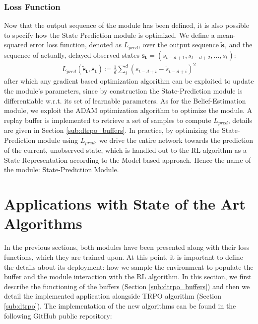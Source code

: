             \subsubsection{Loss Function}
                Now that the output sequence of the module has been defined, it is also possible to specify how the State Prediction module is optimized. We define a mean-squared error loss function, denoted as $L_{pred}$, over the output sequence $\mathbf{\tilde{s}_t}$ and the sequence of actually, delayed observed states $\mathbf{s_t} = (s_{t-d+1}, s_{t-d+2}, ..., s_t)$:
                \begin{align}
                    L_{pred} (\mathbf{\tilde{s}_t}, \mathbf{s_t}) \coloneqq \frac{1}{d} \sum_{i}^{d} \left( s_{t-d+i} - \tilde{s}_{t-d+i}\right)^{2}
                \end{align}
                after which any gradient based optimization algorithm can be exploited to update the module's parameters, since by construction the State-Prediction module is differentiable w.r.t. its set of learnable parameters. As for the Belief-Estimation module, we exploit the ADAM optimization algorithm to optimize the module. A replay buffer is implemented to retrieve a set of samples to compute $L_{pred}$, details are given in Section \ref{sub:dtrpo_buffers}. In practice, by optimizing the State-Prediction module using $L_{pred}$, we drive the entire network towards the prediction of the current, unobserved state, which is handled out to the RL algorithm as a State Representation according to the Model-based approach. Hence the name of the module: State-Prediction Module.
                
    \newpage
    \section{Applications with State of the Art Algorithms}
    \label{ow:application_sota}
        In the previous sections, both modules have been presented along with their loss functions, which they are trained upon. At this point, it is important to define the details about its deployment: how we sample the environment to populate the buffer and the module interaction with the RL algorithm. In this section, we first describe the functioning of the buffers (Section \ref{sub:dtrpo_buffers}) and then we detail the implemented application alongside TRPO algorithm (Section \ref{sub:dtrpo}). The implementation of the new algorithms can be found in the following GitHub public repository: 
        
